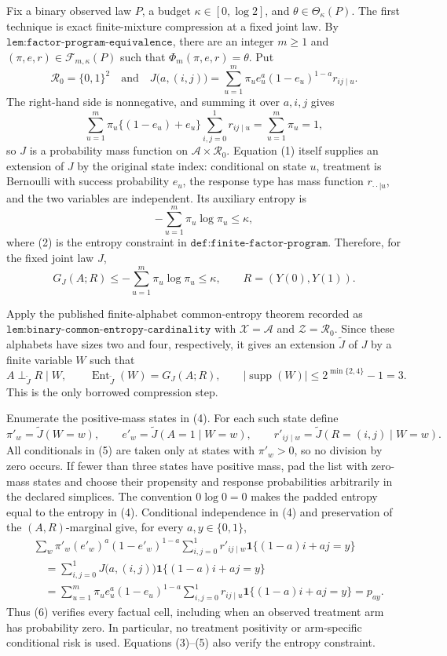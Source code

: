 Fix a binary observed law \(P\), a budget \(\kappa\in[0,\log 2]\), and
\(\theta\in\Theta_\kappa(P)\).  The first technique is exact finite-mixture
compression at a fixed joint law.  By
\(\texttt{lem:factor-program-equivalence}\), there are an integer \(m\geq 1\)
and \((\pi,e,r)\in\mathcal F_{m,\kappa}(P)\) such that
\(\Phi_m(\pi,e,r)=\theta\).  Put
\[
 \mathcal R_0=\{0,1\}^2
 \quad\text{and}\quad
 J\bigl(a,(i,j)\bigr)
 =\sum_{u=1}^m\pi_u e_u^a(1-e_u)^{1-a}r_{ij\mid u}.
 \tag{1}
\]
The right-hand side is nonnegative, and summing it over \(a,i,j\) gives
\[
 \sum_{u=1}^m\pi_u\{(1-e_u)+e_u\}
       \sum_{i,j=0}^1r_{ij\mid u}=\sum_{u=1}^m\pi_u=1,
\]
so \(J\) is a probability mass function on
\(\mathcal A\times\mathcal R_0\).  Equation (1) itself supplies an extension
of \(J\) by the original state index: conditional on state \(u\), treatment
is Bernoulli with success probability \(e_u\), the response type has mass
function \(r_{\cdot\cdot\mid u}\), and the two variables are independent.
Its auxiliary entropy is
\[
 -\sum_{u=1}^m\pi_u\log\pi_u\leq\kappa,
 \tag{2}
\]
where (2) is the entropy constraint in
\(\texttt{def:finite-factor-program}\).  Therefore, for the fixed joint law
\(J\),
\[
 G_J(A;R)\leq-\sum_{u=1}^m\pi_u\log\pi_u\leq\kappa,
 \qquad R=(Y(0),Y(1)).
 \tag{3}
\]

Apply the published finite-alphabet common-entropy theorem recorded as
\(\texttt{lem:binary-common-entropy-cardinality}\) with
\(\mathcal X=\mathcal A\) and \(\mathcal Z=\mathcal R_0\).  Since these
alphabets have sizes two and four, respectively, it gives an extension
\(\widetilde J\) of \(J\) by a finite variable \(W\) such that
\[
 A\perp_{\widetilde J}R\mid W,
 \qquad
 \operatorname{Ent}_{\widetilde J}(W)=G_J(A;R),
 \qquad
 |\operatorname{supp}(W)|\leq 2^{\min\{2,4\}}-1=3.
 \tag{4}
\]
This is the only borrowed compression step.

Enumerate the positive-mass states in (4).  For each such state define
\[
 \pi'_w=\widetilde J(W=w),\qquad
 e'_w=\widetilde J(A=1\mid W=w),\qquad
 r'_{ij\mid w}=\widetilde J(R=(i,j)\mid W=w).
 \tag{5}
\]
All conditionals in (5) are taken only at states with \(\pi'_w>0\), so no
division by zero occurs.  If fewer than three states have positive mass, pad
the list with zero-mass states and choose their propensity and response
probabilities arbitrarily in the declared simplices.  The convention
\(0\log0=0\) makes the padded entropy equal to the entropy in (4).
Conditional independence in (4) and preservation of the \((A,R)\)-marginal
give, for every \(a,y\in\{0,1\}\),
\[
\begin{aligned}
 &\sum_w\pi'_w(e'_w)^a(1-e'_w)^{1-a}
   \sum_{i,j=0}^1r'_{ij\mid w}
      \mathbf 1\{(1-a)i+aj=y\}\\
 &\quad=\sum_{i,j=0}^1J\bigl(a,(i,j)\bigr)
      \mathbf 1\{(1-a)i+aj=y\}\\
 &\quad=\sum_{u=1}^m\pi_u e_u^a(1-e_u)^{1-a}
   \sum_{i,j=0}^1r_{ij\mid u}
      \mathbf 1\{(1-a)i+aj=y\}
 =p_{ay}.
 \tag{6}
\end{aligned}
\]
Thus (6) verifies every factual cell, including when an observed treatment
arm has probability zero.  In particular, no treatment positivity or
arm-specific conditional risk is used.  Equations (3)--(5) also verify the
entropy constraint.

